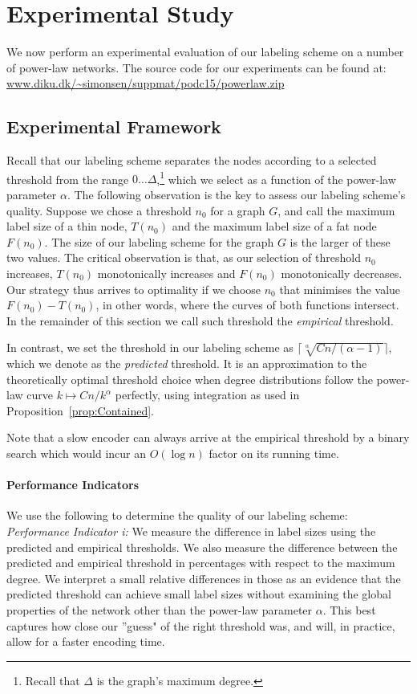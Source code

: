 \section{Experimental Study}

We now  perform an experimental evaluation of our labeling scheme on a number of power-law networks.
The source code for our experiments can be found at:\\ \url{www.diku.dk/\~simonsen/suppmat/podc15/powerlaw.zip}

\subsection{Experimental Framework}\label{Sec:Experimental}
Recall that our labeling scheme separates  the nodes according to a selected threshold from the range $0 \dots \Delta$,\footnote{Recall that $\Delta$ is the graph's maximum degree.} which we select as a function of  the power-law parameter $\alpha$.
The following observation is the key to assess our labeling scheme's quality.
Suppose we chose a threshold  $n_0$ for a graph $G$, and call  the maximum label size of a thin node, $T(n_0)$ and the maximum label size of a fat node $F(n_0)$.  The size of our labeling scheme for the graph $G$ is the larger of these two values.
The critical observation is that, as our selection of threshold $n_0$ increases, $T(n_0)$ monotonically increases and  $F(n_0)$ monotonically decreases.
Our strategy thus arrives to optimality if we choose $n_0$ that minimises  the value $F(n_0)-T(n_0)$, in other words, where the curves of both functions intersect.
In the remainder of this section we call such threshold the \emph{empirical} threshold.

In contrast, we set the threshold in our labeling scheme as $\lceil \sqrt[\alpha]{C n/(\alpha-1)} \rceil$, which we denote as the \emph{predicted} threshold.
It is an approximation to the theoretically optimal threshold choice when degree distributions follow the power-law curve $k\mapsto Cn/k^\alpha$ perfectly, using integration as used in Proposition~\ref{prop:Contained}.

Note that a slow encoder can always arrive at the empirical threshold by a binary search which would incur an $O(\log n)$ factor on its running time. 
\paragraph{Performance Indicators}
We use the following to determine the quality of our labeling scheme:
\emph{Performance Indicator i:} We measure the difference in label sizes using the predicted and empirical thresholds. 
 We also measure  the difference between the predicted and empirical threshold in percentages with respect to the maximum degree.
We interpret a small relative differences in those as an evidence  that the predicted threshold can achieve small label sizes without examining the global properties of the network other than the power-law parameter $\alpha$. 
This best captures how close our ''guess" of the right threshold was, and will, in practice, allow for a faster encoding time.
 
